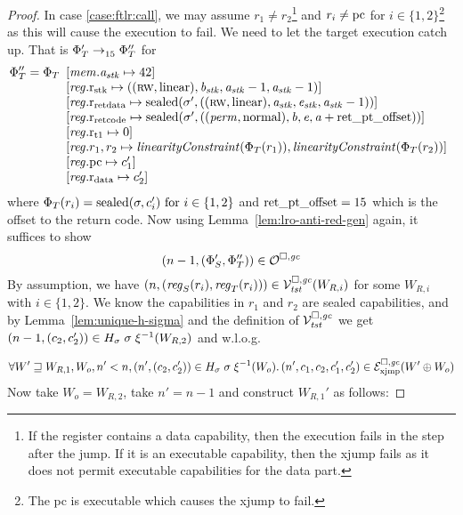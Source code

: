 \begin{proof}
  In case \ref{case:ftlr:call}, we may assume $r_1 \neq r_2$\footnote{If the register contains a data capability, then the execution fails in the step after the jump. If it is an executable capability, then the xjump fails as it does not permit executable capabilities for the data part.} and $r_i \neq \pcreg$ for $i \in \{1,2\}$\footnote{The pc is executable which causes the xjump to fail.} as this will cause the execution to fail.
  We need to let the target execution catch up.
  That is $\Phi_T' \nstep[15]{} \Phi_T''$ for
  \[
    \Phi_T'' = \Phi_T
    \begin{array}[t]{l}
      \update{\mem.\aaddr_\stk}{42} \\
      \updReg{\rstk}{((\rw,\linear),\baddr_\stk,\aaddr_\stk-1,\aaddr_\stk-1)} \\
      \updReg{\rretd}{\sealed{\sigma',((\rw,\linear),\aaddr_\stk,\eaddr_\stk,\aaddr_\stk-1)}} \\
      \updReg{\rretc}{\sealed{\sigma',((\perm,\normal),\baddr,\eaddr,\aaddr+\retoffset)}} \\
      \updReg{\rtmp{1}}{0}\\
      \updReg{r_1,r_2}{\linCons{\Phi_T(r_1)},\linCons{\Phi_T(r_2)}}\\
      \updReg{\pcreg}{c_1'}\\
      \updReg{\rdata}{c_2'}
    \end{array}
  \]
  where $\Phi_T(r_i) = \sealed{\sigma,c_i'} \text{ for $i\in\{1,2\}$}$ and $\retoffset = 15$ which is the offset to the return code.
  Now using Lemma~\ref{lem:lro-anti-red-gen} again, it suffices to show
  \[
    \npair[n-1]{(\Phi_S',\Phi_T'')} \in \lro
  \]
  By assumption, we have $\npair[n]{(\reg_S(r_i),\reg_T(r_i))} \in \lrvg{\trust}(W_{R,i})$ for some $W_{R,i}$ with $i \in \{1,2\}$.
  We know the capabilities in $r_1$ and $r_2$ are sealed capabilities, and by
  Lemma~\ref{lem:unique-h-sigma} and the definition of $\lrvg{\trust}$ we get
  $\npair[n-1]{(c_2,c_2')} \in H_\sigma \; \sigma \; \xi^{-1}(W_{R,2})$
  and w.l.o.g.\

  \begin{equation}
    \forall W' \future W_{R,1}, W_o, n' < n, \npair[n']{(c_2,c_2')} \in H_\sigma \; \sigma \; \xi^{-1}(W_o) \ldotp \npair[n']{c_1,c_2,c_1',c_2'} \in \lrexj(W'\oplus W_o)\label{eq:ftlr:call:sealed-code-assump}
  \end{equation}
  Now take $W_o = W_{R,2}$, take $n' = n-1$ and construct $W_{R,1}'$ as follows:


\end{proof}
